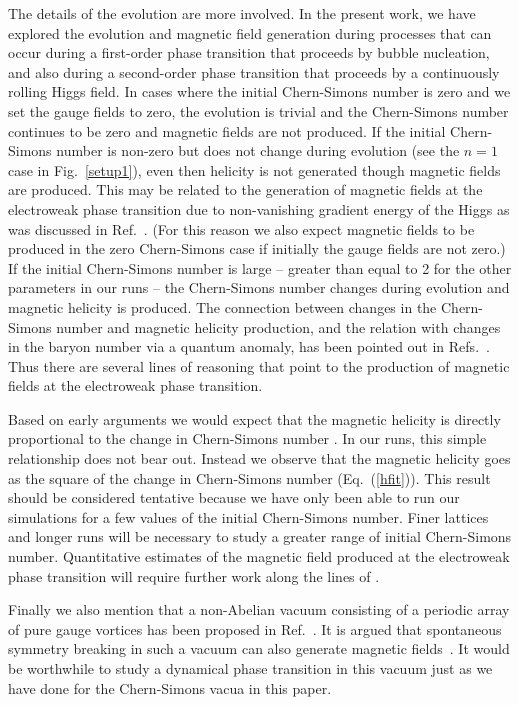 \documentclass[prd,twocolumn,nofootinbib]{revtex4-1}
\begin{document}
The details of the evolution are more involved. 
In the present work, we have explored the evolution and magnetic field generation during
processes that can occur during a first-order phase transition that proceeds by bubble 
nucleation, and also during a second-order phase transition that proceeds by a continuously 
rolling Higgs field. In cases where the initial Chern-Simons number is zero and we set the 
gauge fields to zero, the evolution is trivial and the Chern-Simons number continues to be zero 
and magnetic fields are not produced.
If the initial Chern-Simons number is non-zero but does not change during evolution (see the $n=1$ 
case in Fig.~\ref{setup1}), even then helicity is not generated though magnetic fields are
produced. This may be related to the generation of magnetic fields at the electroweak phase 
transition due to non-vanishing gradient energy of the Higgs as was discussed in 
Ref.~\cite{Vachaspati:1991nm,Vachaspati:1994xc}. 
(For this reason we also expect magnetic fields to be produced in the zero Chern-Simons 
case if initially the gauge fields are not zero.)
If the initial Chern-Simons number is 
large -- greater than equal to 2 for the other parameters in our runs -- the Chern-Simons number 
changes during evolution and magnetic helicity is produced. The connection between changes
in the Chern-Simons number and magnetic helicity production, and the relation
with changes in the baryon number via a quantum anomaly, 
has been pointed out in Refs.~\cite{Cornwall:1997ms,Vachaspati:2001nb,copi2008helical}. Thus there 
are several lines of reasoning that point to the production of magnetic fields at the electroweak phase 
transition.

Based on early arguments we would expect that the magnetic helicity is directly
proportional to the change in Chern-Simons number \cite{Cornwall:1997ms,Vachaspati:2001nb}. 
In our runs, this simple relationship does not bear out. Instead we observe that the magnetic 
helicity goes as the square of the change in Chern-Simons number (Eq.~(\ref{hfit})). 
This result should be considered
tentative because we have only been able to run our simulations for a few
values of the initial Chern-Simons number. Finer lattices and longer runs
will be necessary to study a greater range of initial Chern-Simons number.
Quantitative estimates of the magnetic field produced at the electroweak phase
transition will require further work along the lines of \cite{Mou:2017zwe}. 

Finally we also mention that a non-Abelian vacuum consisting of a periodic
array of pure gauge vortices has been proposed in Ref.~\cite{Olesen:2016pxv}. 
It is argued that spontaneous symmetry breaking in such a vacuum can also 
generate magnetic fields~\cite{Olesen:2017mcu,Olesen:2017ykg}. It would be 
worthwhile to study a dynamical phase transition in this vacuum just as we have 
done for the Chern-Simons vacua in this paper.
\end{document}
